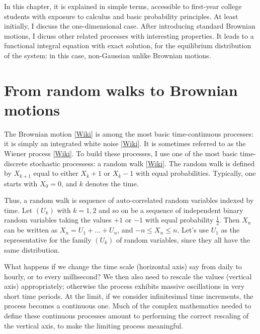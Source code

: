\documentclass[oneside,10pt]{book}
\begin{document}
In this chapter, it is explained in simple terms, accessible to first-year college students with exposure to calculus and basic probability principles. At least initially, I discuss the one-dimensional case. After introducing standard Brownian motions, I dicuss other related processes
 with interesting properties. It leads to a functional integral equation with exact solution, for the equilibrium distribution of the system: in this case, non-Gaussian unlike Brownian motions.

\section{From random walks to Brownian motions}\label{bmrwp}

The \textcolor{index}{Brownian motion} [\href{https://en.wikipedia.org/wiki/Brownian_motion}{Wiki}] is among the most basic time-continuous processes: it is simply an integrated \textcolor{index}{white noise} [\href{https://en.wikipedia.org/wiki/White_noise}{Wiki}]. It is sometimes referred to as the \textcolor{index}{Wiener process} [\href{https://en.wikipedia.org/wiki/Wiener_process}{Wiki}].
To build these processes, I use one of  the most basic time-discrete stochastic processess:  a \textcolor{index}{random walk} [\href{https://en.wikipedia.org/wiki/Random_walk}{Wiki}].  The random walk is defined by $X_{k+1}$ equal to either $X_k + 1$ or $X_k -1$ with equal probabilities. Typically, one starts with $X_0=0$, and $k$ denotes the time.

Thus, a random walk is sequence of auto-correlated random variables indexed by time. Let $(U_k)$ with $k=1,2$ and so on be a sequence of independent binary random variables taking the values $+1$ or $-1$
 with equal probability $\frac{1}{2}$. Then $X_n$ can be written as $X_n = U_1 + \dots + U_n$, and $-n\leq X_n\leq n$. Let's use $U_1$ as the representative for the family $(U_k)$ of random variables, since they all have the same distribution.


What happens if we change the time scale (horizontal axis) say from daily to hourly, or to every millisecond? We then also need to rescale the values (vertical axis) appropriately; otherwise the process exhibits massive oscillations in very short time periods. At the limit, if we consider infinitesimal time increments, the process becomes a continuous one. Much of the complex mathematics needed to define these continuous processes amount to performing the correct rescaling of the vertical axis, to make the limiting process meaningful.
\end{document}

